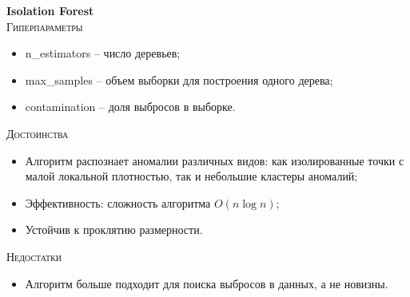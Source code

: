 \documentclass[12pt]{article}
\begin{document}
    \newpage


    \textbf{Isolation Forest} \\

    \noindent \textsc{Гиперпараметры}
    \begin{itemize}
        \item n\_estimators – число деревьев;
        \item max\_samples – объем выборки для построения одного дерева;
        \item contamination – доля выбросов в выборке.
    \end{itemize}

    \noindent \textsc{Достоинства}
    \begin{itemize}
        \item Алгоритм распознает аномалии различных видов: как изолированные точки с малой локальной плотностью, так и небольшие кластеры аномалий;
        \item Эффективность: сложность алгоритма $ O(n \log n) $;
        \item Устойчив к проклятию размерности.
    \end{itemize}

    \noindent \textsc{Недостатки}
    \begin{itemize}
        \item Алгоритм больше подходит для поиска выбросов в данных, а не новизны.
    \end{itemize}
\end{document}
